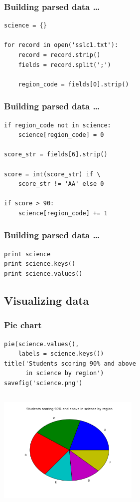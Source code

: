 \documentclass[14pt,compress]{beamer}
\newcounter{time}
\newcommand{\inctime}[1]{\addtocounter{time}{#1}{\tiny \thetime\ m}}
\begin{document}
\begin{frame}[fragile]
  \frametitle{Building parsed data \ldots}
  \begin{lstlisting}
science = {}

for record in open('sslc1.txt'):
    record = record.strip()
    fields = record.split(';')

    region_code = fields[0].strip()
  \end{lstlisting}
\end{frame}

\begin{frame}[fragile]
  \frametitle{Building parsed data \ldots}
  \begin{lstlisting}
if region_code not in science:
    science[region_code] = 0

score_str = fields[6].strip()

score = int(score_str) if \
    score_str != 'AA' else 0

if score > 90:
    science[region_code] += 1
  \end{lstlisting}
\end{frame}

\begin{frame}[fragile]
  \frametitle{Building parsed data \ldots}
  \begin{lstlisting}
print science
print science.keys()
print science.values()
  \end{lstlisting}
\end{frame}

\subsection{Visualizing data}
\begin{frame}[fragile]
  \frametitle{Pie chart}
  \small
  \begin{lstlisting}
pie(science.values(), 
    labels = science.keys())
title('Students scoring 90% and above 
      in science by region')
savefig('science.png')
  \end{lstlisting}
\begin{columns}
    \hspace*{1.1in}
\includegraphics[height=2in, interpolate=true]{data/science}
\end{columns}
  \inctime{10}
\end{frame}
\end{document}
